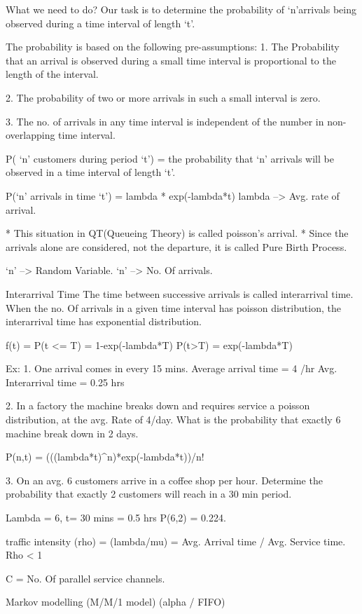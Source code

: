 What we need to do?
Our task is to determine the probability of ‘n’arrivals being observed during a time interval of length ‘t’.

The probability is based on the following pre-assumptions:
1. The Probability that an arrival is observed during a small time interval is proportional to the length of the interval.

2. The probability of two or more arrivals in such a small interval is zero.

3. The no. of arrivals in any time interval is independent of the number in non-overlapping time interval.

P( ‘n’ customers during period ‘t’) = the probability that ‘n’ arrivals will be observed in a time interval of length ‘t’.

P(‘n’ arrivals in time ‘t’) = lambda * exp(-lambda*t)
lambda --> Avg. rate of arrival.

* This situation in QT(Queueing Theory) is called poisson’s arrival.
* Since the arrivals alone are considered, not the departure, it is called Pure Birth Process.

‘n’ --> Random Variable.
‘n’ --> No. Of arrivals.

Interarrival Time
The time between successive arrivals is called interarrival time.
When the no. Of arrivals in a given time interval has poisson distribution, the interarrival time has exponential distribution.

f(t) = 
P(t <= T) = 1-exp(-lambda*T)
P(t>T) = exp(-lambda*T)

Ex:
1. One arrival comes in every 15 mins.
	Average arrival time = 4 /hr
	Avg. Interarrival time = 0.25 hrs

2. In a factory the machine breaks down and requires service a poisson distribution, at the avg. Rate of 4/day. What is the probability that exactly 6 machine break down in 2 days.

P(n,t) = (((lambda*t)^n)*exp(-lambda*t))/n!

3. On an avg. 6 customers arrive in a coffee shop per hour. Determine the probability that exactly 2 customers will reach in a 30 min period.

Lambda = 6, t= 30 mins = 0.5 hrs
P(6,2) = 0.224.

traffic intensity (rho) = (lambda/mu) = Avg. Arrival time / Avg. Service time.
Rho < 1
 
C = No. Of parallel service channels.

Markov modelling (M/M/1 model) (alpha / FIFO)


